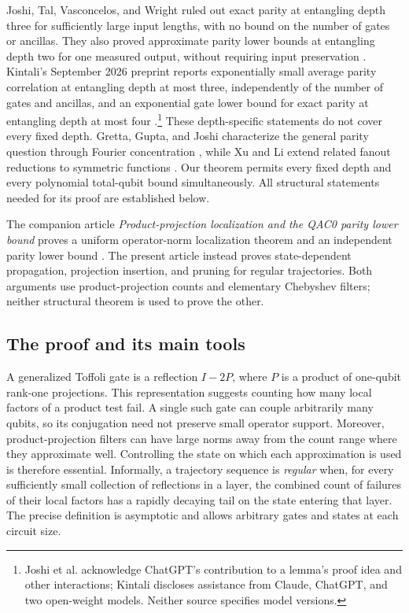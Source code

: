 Joshi, Tal, Vasconcelos, and Wright ruled out exact parity at
entangling depth three for sufficiently large input lengths, with no
bound on the number of gates or ancillas. They also proved approximate
parity lower bounds at entangling depth two for one measured output,
without requiring input preservation
\citep{JoshiTalVasconcelosWright2025}. Kintali's September 2026
preprint reports exponentially small average parity correlation at
entangling depth at most three, independently of the number of gates
and ancillas, and an exponential gate lower bound for exact parity at
entangling depth at most four
\citep[Theorems~1--2]{Kintali2026ShallowParity}.\footnote{Joshi et al.
acknowledge ChatGPT's contribution to a lemma's proof idea and other
interactions; Kintali discloses assistance from Claude, ChatGPT, and
two open-weight models. Neither source specifies model versions.}
These depth-specific statements do not cover every fixed depth.
Gretta, Gupta, and Joshi characterize the general parity question
through Fourier concentration \citep{GGJ2026Fourier}, while Xu and Li
extend related fanout reductions to symmetric functions
\citep{XuLi2026Fanout}. Our theorem permits every fixed depth and
every polynomial total-qubit bound simultaneously. All structural
statements needed for its proof are established below.

The companion article \emph{Product-projection localization and the
QAC0 parity lower bound} proves a uniform operator-norm localization
theorem and an independent parity lower bound
\citep[Sections~2 and~6]{OpenAILocalization2026}. The present article instead
proves state-dependent propagation, projection insertion, and pruning
for regular trajectories. Both arguments use product-projection counts
and elementary Chebyshev filters; neither structural theorem is used
to prove the other.

\subsection{The proof and its main tools}

A generalized Toffoli gate is a reflection $I-2P$, where $P$ is a
product of one-qubit rank-one projections. This representation suggests
counting how many local factors of a product test fail. A single such
gate can couple arbitrarily many qubits, so its conjugation need not
preserve small operator support. Moreover, product-projection filters
can have large norms away from the count range where they approximate
well. Controlling the state on which each approximation is used is
therefore essential.
Informally, a trajectory sequence is \emph{regular} when, for every
sufficiently small collection of reflections in a layer, the combined count
of failures of their local factors has a rapidly decaying tail on the state
entering that layer. The precise definition is asymptotic and allows
arbitrary gates and states at each circuit size.

